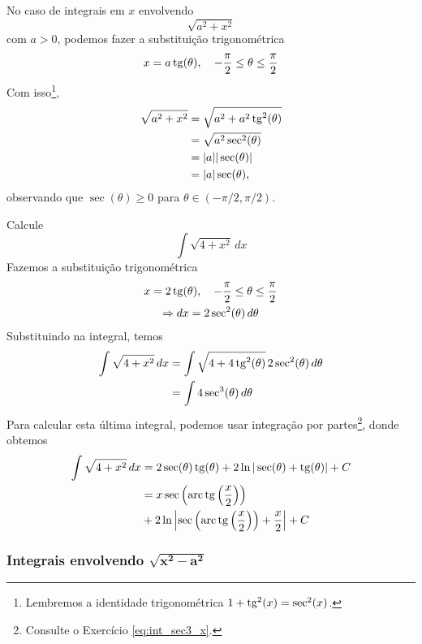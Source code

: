 No caso de integrais em $x$ envolvendo
\begin{equation}
  \sqrt{a^2 + x^2}
\end{equation}
com $a>0$, podemos fazer a substituição trigonométrica
\begin{equation}
  x = a\operatorname{tg}(\theta),\quad -\frac{\pi}{2}\leq\theta\leq\frac{\pi}{2} 
\end{equation}
Com isso\footnote{Lembremos a identidade trigonométrica $1 + \operatorname{tg}^2(x) = \sec^2(x)$.},
\begin{align}
  \sqrt{a^2 + x^2} &= \sqrt{a^2 + a^2\operatorname{tg}^2(\theta)}\\
                   &= \sqrt{a^2\sec^2(\theta)}\\
                   &= |a||\sec(\theta)|\\
                   &= |a|\sec(\theta),
\end{align}
observando que $\sec(\theta) \geq 0$ para $\theta\in(-\pi/2,\pi/2)$.

\begin{ex}
  Calcule
  \begin{equation}
    \int \sqrt{4 + x^2}\,dx
  \end{equation}
  Fazemos a substituição trigonométrica
  \begin{gather}
    x = 2\operatorname{tg}(\theta),\quad-\frac{\pi}{2}\leq\theta\leq\frac{\pi}{2}\\
    \Rightarrow
    dx = 2\sec^2(\theta)\,d\theta
  \end{gather}
  Substituindo na integral, temos
  \begin{align}
    \int \sqrt{4 + x^2}\,dx &= \int \sqrt{4 + 4\operatorname{tg}^2(\theta)}\,2\sec^2(\theta)\,d\theta\\
                            &= \int 4\sec^3(\theta)\,d\theta
  \end{align}
  Para calcular esta última integral, podemos usar integração por partes\footnote{Consulte o Exercício \ref{eq:int_sec3_x}.}, donde obtemos
  \begin{align}
    \int \sqrt{4 + x^2}\,dx &= 2\sec(\theta)\operatorname{tg}(\theta) + 2\ln|\sec(\theta)+\operatorname{tg}(\theta)| + C\\
                              &= x\sec\left(\operatorname{arc}\operatorname{tg}\left(\frac{x}{2}\right)\right) \\
                              &+ 2\ln\left|\sec\left(\operatorname{arc}\operatorname{tg}\left(\frac{x}{2}\right)\right) + \frac{x}{2}\right| + C
  \end{align}
\end{ex}

\subsubsection{Integrais envolvendo $\pmb{\sqrt{x^2 - a^2}}$}

